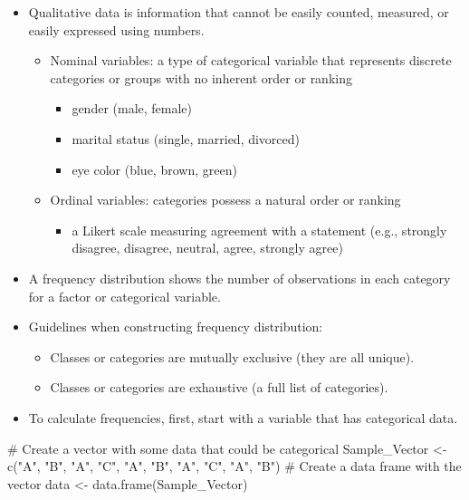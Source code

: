 \documentclass[
  letterpaper,
  DIV=11,
  numbers=noendperiod]{scrreprt}
\newenvironment{Shaded}{\begin{snugshade}}{\end{snugshade}}
\newcommand{\CommentTok}[1]{\textcolor[rgb]{0.37,0.37,0.37}{#1}}
\newcommand{\FunctionTok}[1]{\textcolor[rgb]{0.28,0.35,0.67}{#1}}
\newcommand{\NormalTok}[1]{\textcolor[rgb]{0.00,0.23,0.31}{#1}}
\newcommand{\OtherTok}[1]{\textcolor[rgb]{0.00,0.23,0.31}{#1}}
\newcommand{\StringTok}[1]{\textcolor[rgb]{0.13,0.47,0.30}{#1}}
\providecommand{\tightlist}{%
  \setlength{\itemsep}{0pt}\setlength{\parskip}{0pt}}\usepackage{longtable,booktabs,array}
\begin{document}
\begin{itemize}
\tightlist
\item
  Qualitative data is information that cannot be easily counted,
  measured, or easily expressed using numbers.

  \begin{itemize}
  \tightlist
  \item
    Nominal variables: a type of categorical variable that represents
    discrete categories or groups with no inherent order or ranking

    \begin{itemize}
    \tightlist
    \item
      gender (male, female)
    \item
      marital status (single, married, divorced)
    \item
      eye color (blue, brown, green)
    \end{itemize}
  \item
    Ordinal variables: categories possess a natural order or ranking

    \begin{itemize}
    \tightlist
    \item
      a Likert scale measuring agreement with a statement (e.g.,
      strongly disagree, disagree, neutral, agree, strongly agree)
    \end{itemize}
  \end{itemize}
\item
  A frequency distribution shows the number of observations in each
  category for a factor or categorical variable.
\item
  Guidelines when constructing frequency distribution:

  \begin{itemize}
  \tightlist
  \item
    Classes or categories are mutually exclusive (they are all unique).
  \item
    Classes or categories are exhaustive (a full list of categories).
  \end{itemize}
\item
  To calculate frequencies, first, start with a variable that has
  categorical data.
\end{itemize}

\begin{Shaded}
\begin{Highlighting}[]
\CommentTok{\# Create a vector with some data that could be categorical}
\NormalTok{Sample\_Vector }\OtherTok{\textless{}{-}} \FunctionTok{c}\NormalTok{(}\StringTok{"A"}\NormalTok{, }\StringTok{"B"}\NormalTok{, }\StringTok{"A"}\NormalTok{, }\StringTok{"C"}\NormalTok{, }\StringTok{"A"}\NormalTok{, }\StringTok{"B"}\NormalTok{, }\StringTok{"A"}\NormalTok{, }\StringTok{"C"}\NormalTok{, }\StringTok{"A"}\NormalTok{, }\StringTok{"B"}\NormalTok{)}
\CommentTok{\# Create a data frame with the vector}
\NormalTok{data }\OtherTok{\textless{}{-}} \FunctionTok{data.frame}\NormalTok{(Sample\_Vector)}
\end{Highlighting}
\end{Shaded}
\end{document}
